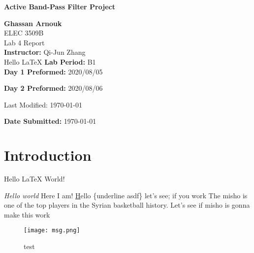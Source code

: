 \documentclass[hidelinks]{article}
\begin{document}
	\begin{titlepage}
		\begin{center}
			\vspace{1cm}
			{\LARGE\textbf{Active Band-Pass Filter Project}}

			\vspace{1.5cm}
			\textbf{\large Ghassan Arnouk}\\

			\vspace{1cm}
			\large ELEC 3509B\\
			\large Lab 4 Report\\


			\vspace{2cm}
			\textbf{Instructor:} Qi-Jun Zhang\\

            Hello \LaTeX
			\vspace{1cm}
			\textbf{Lab Period:} B1\\

			\vspace{0.1cm}
			\textbf{Day 1 Preformed:} 2020/08/05

			\vspace{0.1cm}
			\textbf{Day 2 Preformed:} 2020/08/06

            Last Modified: \today

			\vspace{1cm}
			\textbf{Date Submitted:} \today\\
		\end{center}
	\end{titlepage}

	\pagebreak




	\section{Introduction}
    Hello {\LaTeX} World!

    \emph{Hello world} Here I am!
    \underline Hello \{underline asdf\} let's see; if you work
    The \Gls{misho} is one of the top players in the Syrian basketball history.
    Let's see if \gls{misho} is gonna make this work

    \clearpage
	\begin{figure}[htbp]
		\centering
		\texttt{[image: msg.png]}
		\caption{test}
		\label{fig:test}
	\end{figure}
  \printglossary
\end{document}
